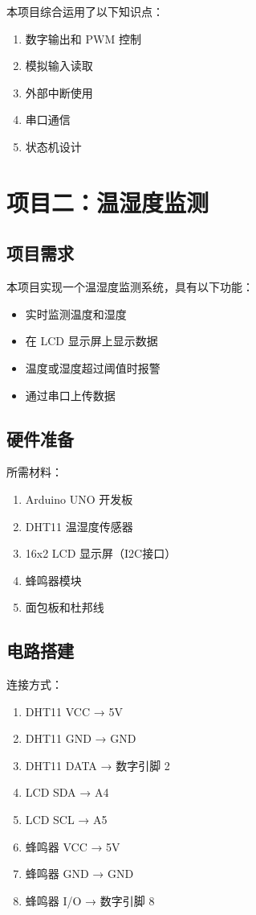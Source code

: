 \documentclass[12pt,UTF8]{ctexbook}
\begin{document}
本项目综合运用了以下知识点：
\begin{enumerate}
    \item 数字输出和 PWM 控制
    \item 模拟输入读取
    \item 外部中断使用
    \item 串口通信
    \item 状态机设计
\end{enumerate}

\chapter{项目二：温湿度监测}

\section{项目需求}

本项目实现一个温湿度监测系统，具有以下功能：
\begin{itemize}
    \item 实时监测温度和湿度
    \item 在 LCD 显示屏上显示数据
    \item 温度或湿度超过阈值时报警
    \item 通过串口上传数据
\end{itemize}

\section{硬件准备}

所需材料：
\begin{enumerate}
    \item Arduino UNO 开发板
    \item DHT11 温湿度传感器
    \item 16x2 LCD 显示屏（I2C接口）
    \item 蜂鸣器模块
    \item 面包板和杜邦线
\end{enumerate}

\section{电路搭建}

连接方式：
\begin{enumerate}
    \item DHT11 VCC → 5V
    \item DHT11 GND → GND
    \item DHT11 DATA → 数字引脚 2
    \item LCD SDA → A4
    \item LCD SCL → A5
    \item 蜂鸣器 VCC → 5V
    \item 蜂鸣器 GND → GND
    \item 蜂鸣器 I/O → 数字引脚 8
\end{enumerate}
\end{document}

